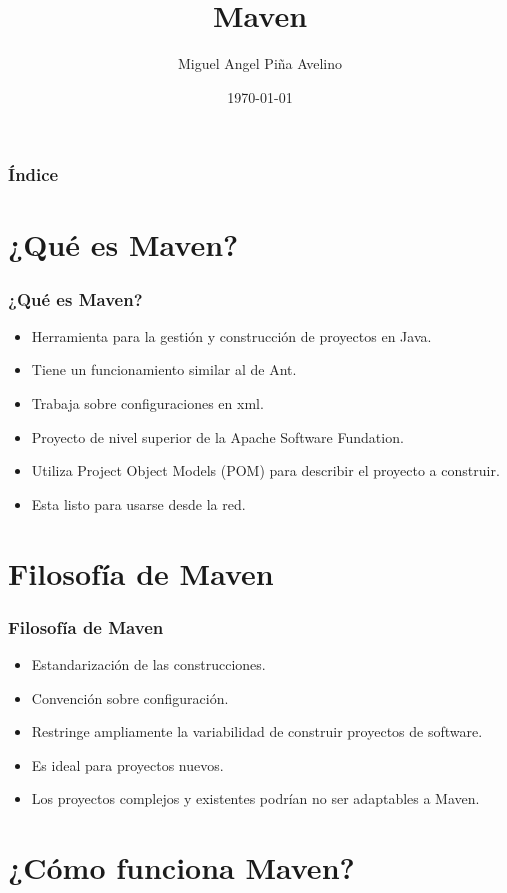 \documentclass{beamer}
\title[Laboratorio]{Maven}
\author[Miguel]{Miguel Angel Piña Avelino}
\institute[UNAM]{
  Ingeniería de Software,\\
  Facultad de Ciencias, UNAM
}
\date{\today}
\begin{document}
\frame{\titlepage}
\begin{frame}
  \frametitle{Índice}
  \tableofcontents
\end{frame}

\section{¿Qué es Maven?}

\begin{frame}
  \frametitle{¿Qué es Maven?}
  \begin{itemize}[<+->]
  \item Herramienta para la gestión y construcción de proyectos en Java.
  \item Tiene un funcionamiento similar al de Ant.
  \item Trabaja sobre configuraciones en xml.
  \item Proyecto de nivel superior de la Apache Software Fundation.
  \item Utiliza Project Object Models (POM) para describir el proyecto a construir.
  \item Esta listo para usarse desde la red.
  \end{itemize}
\end{frame}

\section{Filosofía de Maven}

\begin{frame}
  \frametitle{Filosofía de Maven}
  \begin{itemize}[<+->]
  \item Estandarización de las construcciones.
  \item Convención sobre configuración.
  \item Restringe ampliamente la variabilidad de construir proyectos de software.
  \item Es ideal para proyectos nuevos.
  \item Los proyectos complejos y existentes podrían no ser adaptables a Maven.
  \end{itemize}
\end{frame}

\section{¿Cómo funciona Maven?}
\end{document}
